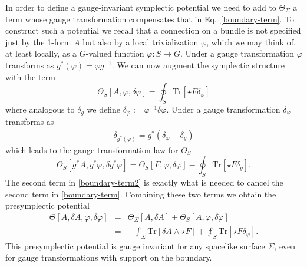 \documentclass[a4paper,11pt]{article}
\newcommand{\bea}{\begin{eqnarray}}
\newcommand{\eea}{\end{eqnarray}}
\newcommand{\Tr}{\mbox{Tr}}
\begin{document}
In order to define a gauge-invariant symplectic potential we need to add to $\Theta_\Sigma$ a term whose gauge transformation compensates that in Eq.~\eqref{boundary-term}.
To construct such a potential we recall that a connection on a bundle is not specified just by the 1-form $A$ but also by a local trivialization $\varphi$, which we may think of, at least locally, as a $G$-valued function $\varphi:S \to G$.
Under a gauge transformation $\varphi$ transforms as
$g^*(\varphi) = \varphi g^{-1}$.
We can now augment the symplectic structure with the term
\begin{equation}
\Theta_S[A, \varphi, \delta \varphi] = \oint_S \Tr[\star F \delta_\varphi]
\end{equation}
where analogous to $\delta_g$ we define $\delta_\varphi := \varphi^{-1} \delta \varphi$.
Under a gauge transformation $\delta_\varphi$ transforms as
\begin{align} \label{deltagstarphi}
\delta_{g^*(\varphi)} = g^*( \delta_\varphi -\delta_g)
\end{align} which leads to the gauge transformation law for $\Theta_S$
\begin{equation} \label{boundary-term2}
\Theta_S[g^* A, g^*\varphi, \delta g^* \varphi] = \Theta_S[F, \varphi, \delta \varphi] - \oint_S \Tr[\star F \delta_g].
\end{equation}
The second term in \eqref{boundary-term2} is exactly what is needed to cancel the second term in \eqref{boundary-term}.
Combining these two terms we obtain the presymplectic potential
\bea
\Theta[A, \delta A, \varphi, \delta \varphi] &=& \Theta_\Sigma[A, \delta A] + \Theta_S[A, \varphi, \delta \varphi] \\
&=& -\int_\Sigma \Tr[ \delta A \wedge \star F ] + \oint_S \Tr[\star F \delta_\varphi].
\eea 
This presymplectic potential is gauge invariant for any spacelike surface $\Sigma$, even for gauge transformations with support on the boundary.
\end{document}
